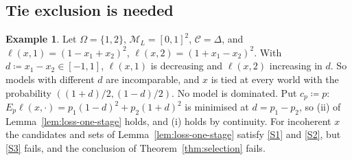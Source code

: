 \documentclass[11pt]{article}
\theoremstyle{definition}
\newtheorem{example}[theorem]{Example}
\theoremstyle{remark}
\newcommand{\M}{\mathcal M}
\newcommand{\C}{\mathcal C}
\begin{document}
\subsection{Tie exclusion is needed}

\begin{example}\label{ex:ties}
Let $\Omega=\{1,2\}$, $\M_L=[0,1]^2$, $\C=\Delta$, and $\ell(x,1)=(1-x_1+x_2)^2$, $\ell(x,2)=(1+x_1-x_2)^2$. With $d\coloneqq x_1-x_2\in[-1,1]$, $\ell(x,1)$ is decreasing and $\ell(x,2)$ increasing in $d$. So models with different $d$ are incomparable, and $x$ is tied at every world with the probability $((1+d)/2,(1-d)/2)$. No model is dominated. Put $c_p\coloneqq p$: $E_p\ell(x,\cdot)=p_1(1-d)^2+p_2(1+d)^2$ is minimised at $d=p_1-p_2$, so (ii) of Lemma~\ref{lem:loss-one-stage} holds, and (i) holds by continuity. For incoherent $x$ the candidates and sets of Lemma~\ref{lem:loss-one-stage} satisfy \ref{S1} and \ref{S2}, but \ref{S3} fails, and the conclusion of Theorem~\ref{thm:selection} fails.
\end{example}



\end{document}

